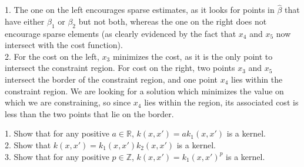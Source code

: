 \documentclass[12pt,letterpaper,boxed]{hmcpset}
\begin{document}

\begin{problem}[Problem 1]
\end{problem}

\begin{solution}
1. The one on the left encourages sparse estimates, as it looks for points in $\hat{\beta}$ that have either $\beta_1$ or $\beta_2$ but not both, whereas the one on the right does not encourage sparse elements (as clearly evidenced by the fact that $x_4$ and $x_5$ now intersect with the cost function). \\
2. For the cost on the left, $x_3$ minimizes the cost, as it is the only point to intersect the constraint region. For cost on the right, two points $x_3$ and $x_5$ intersect the border of the constraint region, and one point $x_4$ lies within the constraint region. We are looking for a solution which minimizes the value on which we are constraining, so since $x_4$ lies within the region, its associated cost is less than the two points that lie on the border. \\
\end{solution}


\begin{problem}[Problem 2]

\end{problem}

\begin{solution}
1. Show that for any positive $a \in \mathbb{R}$, $k(x,x') = ak_1(x,x')$ is a kernel. \\
2. Show that $k(x,x') = k_1(x,x')k_2(x,x')$ is a kernel. \\
3. Show that for any positive $p \in \mathbb{Z}$, $k(x,x') = k_1(x,x')^p$ is a kernel. \\

\end{solution}
\end{document}
